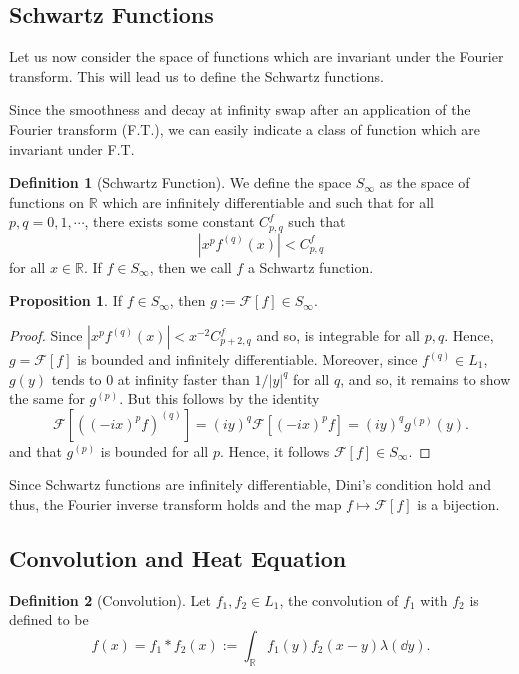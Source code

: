 \documentclass[]{article}
\theoremstyle{definition}
\theoremstyle{definition}
\newtheorem{definition}{Definition}[section]
\newtheorem{proposition}{Proposition}[section]
\begin{document}
\subsection{Schwartz Functions}

Let us now consider the space of functions which are invariant under the Fourier 
transform. This will lead us to define the Schwartz functions.

Since the smoothness and decay at infinity swap after an application of the Fourier 
transform (F.T.), we can easily indicate a class of function which are invariant 
under F.T.

\begin{definition}[Schwartz Function]
  We define the space \(S_\infty\) as the space of functions on \(\mathbb{R}\) 
  which are infinitely differentiable and such that for all \(p, q = 0, 1, \cdots\), 
  there exists some constant \(C_{p, q}^f\) such that 
  \[|x^p f^{(q)}(x)| < C_{p, q}^f\]
  for all \(x \in \mathbb{R}\). If \(f \in S_\infty\), then we call \(f\) a Schwartz 
  function.
\end{definition}

\begin{proposition}
   If \(f \in S_\infty\), then \(g := \mathcal{F}[f] \in S_\infty\).
\end{proposition}
\begin{proof}
  Since \(|x^pf^{(q)}(x)| < x^{-2} C_{p + 2, q}^f\) and so, is integrable 
  for all \(p, q\). Hence, \(g = \mathcal{F}[f]\) is bounded and infinitely differentiable.
  Moreover, since \(f^{(q)} \in L_1\), \(g(y)\) tends to 0 at infinity faster 
  than \(1 / |y|^q\) for all \(q\), and so, it remains to show the same for \(g^{(p)}\). 
  But this follows by the identity 
  \[\mathcal{F}[((-ix)^p f)^{(q)}] = (i y)^q \mathcal{F}[(-ix)^p f] = 
    (iy)^q g^{(p)}(y).\]
  and that \(g^{(p)}\) is bounded for all \(p\). Hence, it follows \(\mathcal{F}[f] \in S_\infty\).
\end{proof}

Since Schwartz functions are infinitely differentiable, Dini's condition hold and thus, 
the Fourier inverse transform holds and the map \(f \mapsto \mathcal{F}[f]\) is a
bijection.

\subsection{Convolution and Heat Equation}

\begin{definition}[Convolution]
  Let \(f_1, f_2 \in L_1\), the convolution of \(f_1\) with \(f_2\) is defined to be 
  \[f(x) = f_1 * f_2(x) := \int_{\mathbb{R}} f_1(y)f_2(x - y) \lambda(\dd y).\]
\end{definition}
\end{document}
